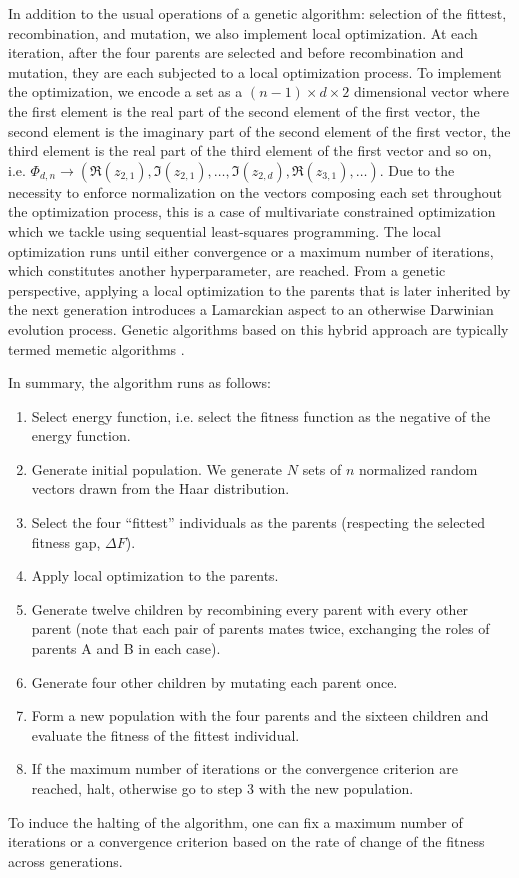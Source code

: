 \documentclass[%
superscriptaddress,
amsmath,amssymb,
 aps,
pra,
floatfix,
]{revtex4-2}
\begin{document}
In addition to the usual operations of a genetic algorithm: selection of the fittest, recombination, and mutation, we also implement local optimization. At each iteration, after the four parents are selected and before recombination and mutation, they are each subjected to a local optimization process. To implement the optimization, we encode a set as a $(n-1) \times d \times 2$ dimensional vector where the first element is the real part of the second element of the first vector, the second element is the imaginary part of the second element of the first vector, the third element is the real part of the third element of the first vector and so on, i.e. $\Phi_{d, n} \to (\Re(z_{2, 1}), \Im(z_{2, 1}), \ldots, \Im(z_{2, d}), \Re(z_{3, 1}), \ldots)$. Due to the necessity to enforce normalization on the vectors composing each set throughout the optimization process, this is a case of multivariate constrained optimization which we tackle using sequential least-squares programming. The local optimization runs until either convergence or a maximum number of iterations, which constitutes another hyperparameter, are reached. From a genetic perspective, applying a local optimization to the parents that is later inherited by the next generation introduces a Lamarckian aspect to an otherwise Darwinian evolution process. Genetic algorithms based on this hybrid approach are typically termed memetic algorithms \cite{moscato2000on}.

In summary, the algorithm runs as follows:
%
\begin{enumerate}
    \item Select energy function, i.e. select the fitness function as the negative of the energy function.
    \item Generate initial population. We generate $N$ sets of $n$ normalized random vectors drawn from the Haar distribution.
    \item Select the four ``fittest'' individuals as the parents (respecting the selected fitness gap, $\Delta F$).
    \item Apply local optimization to the parents.
    \item Generate twelve children by recombining every parent with every other parent (note that each pair of parents mates twice, exchanging the roles of parents A and B in each case).
    \item Generate four other children by mutating each parent once.
    \item Form a new population with the four parents and the sixteen children and evaluate the fitness of the fittest individual.
    \item If the maximum number of iterations or the convergence criterion are reached, halt, otherwise go to step 3 with the new population.
\end{enumerate}
%
To induce the halting of the algorithm, one can fix a maximum number of iterations or a convergence criterion based on the rate of change of the fitness across generations.
\end{document}

